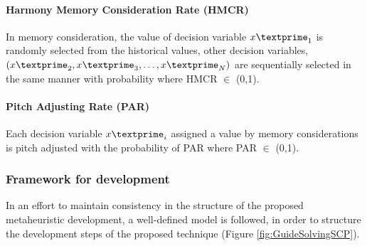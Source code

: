 \paragraph{Harmony Memory Consideration Rate (HMCR)} 
In memory consideration, the value of decision variable ${x\textprime}_1$ is randomly selected from the historical values, other decision variables, $({x\textprime}_2, {x\textprime}_3,\dots,{x\textprime}_N)$ are sequentially selected in the same manner with probability where HMCR $\in$ (0,1).

\paragraph{Pitch Adjusting Rate (PAR)} 
Each decision variable ${x\textprime}_i$ assigned a value by memory considerations is pitch adjusted with the probability of PAR where PAR $\in$ (0,1).

\subsubsection{Framework for development}
In an effort to maintain consistency in the structure of the proposed metaheuristic development, a well-defined model is followed, in order to structure the development steps of the proposed technique (Figure \ref{fig:GuideSolvingSCP}).



